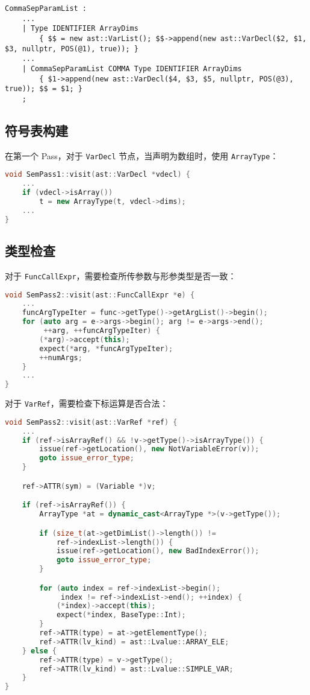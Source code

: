 \documentclass[a4paper]{article}
\begin{document}
\begin{lstlisting}[]
CommaSepParamList :
    ...
    | Type IDENTIFIER ArrayDims
        { $$ = new ast::VarList(); $$->append(new ast::VarDecl($2, $1, $3, nullptr, POS(@1), true)); }
    ...
    | CommaSepParamList COMMA Type IDENTIFIER ArrayDims
        { $1->append(new ast::VarDecl($4, $3, $5, nullptr, POS(@3), true)); $$ = $1; }
    ;
\end{lstlisting}

\subsection{符号表构建}

在第一个 Pass，对于 \texttt{VarDecl} 节点，当声明为数组时，使用 \texttt{ArrayType}：

\begin{lstlisting}[language=c++]
void SemPass1::visit(ast::VarDecl *vdecl) {
    ...
    if (vdecl->isArray())
        t = new ArrayType(t, vdecl->dims);
    ...
}
\end{lstlisting}

\subsection{类型检查}

对于 \texttt{FuncCallExpr}，需要检查所传参数与形参类型是否一致：

\begin{lstlisting}[language=c++]
void SemPass2::visit(ast::FuncCallExpr *e) {
    ...
    funcArgTypeIter = func->getType()->getArgList()->begin();
    for (auto arg = e->args->begin(); arg != e->args->end();
         ++arg, ++funcArgTypeIter) {
        (*arg)->accept(this);
        expect(*arg, *funcArgTypeIter);
        ++numArgs;
    }
    ...
}
\end{lstlisting}

对于 \texttt{VarRef}，需要检查下标运算是否合法：

\begin{lstlisting}[language=c++]
void SemPass2::visit(ast::VarRef *ref) {
    ...
    if (ref->isArrayRef() && !v->getType()->isArrayType()) {
        issue(ref->getLocation(), new NotVariableError(v));
        goto issue_error_type;
    }

    ref->ATTR(sym) = (Variable *)v;

    if (ref->isArrayRef()) {
        ArrayType *at = dynamic_cast<ArrayType *>(v->getType());

        if (size_t(at->getDimList()->length()) !=
            ref->indexList->length()) {
            issue(ref->getLocation(), new BadIndexError());
            goto issue_error_type;
        }

        for (auto index = ref->indexList->begin();
             index != ref->indexList->end(); ++index) {
            (*index)->accept(this);
            expect(*index, BaseType::Int);
        }
        ref->ATTR(type) = at->getElementType();
        ref->ATTR(lv_kind) = ast::Lvalue::ARRAY_ELE;
    } else {
        ref->ATTR(type) = v->getType();
        ref->ATTR(lv_kind) = ast::Lvalue::SIMPLE_VAR;
    }
}
\end{lstlisting}
\end{document}
